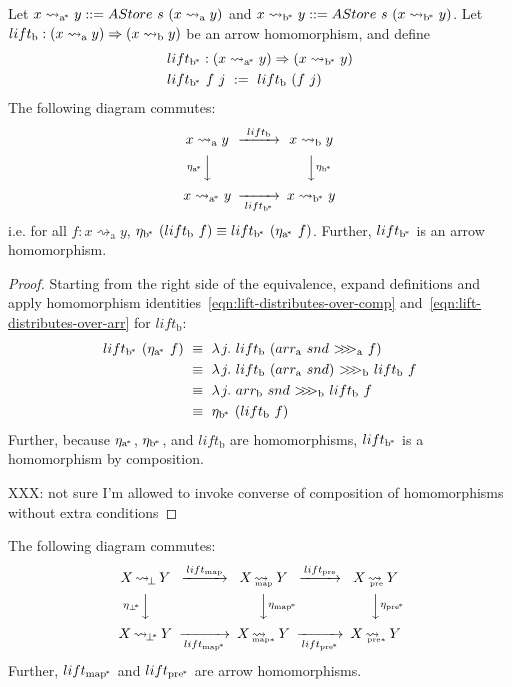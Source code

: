\documentclass[preprint]{sigplanconf}
\newcommand{\arrow}{\rightsquigarrow}
\newcommand{\arrowlift}{\ensuremath{lift}}
\newcommand{\arrowarr}{\ensuremath{arr}}
\newcommand{\arrowcomp}{\ensuremath{{>}\mspace{-6mu}{>}\mspace{-6mu}{>}}}
\newcommand{\arrowtrans}{\ensuremath{\eta}}
\newcommand{\gen}{_\mathrm{a}}
\newcommand{\genb}{_\mathrm{b}}
\newcommand{\genc}{_\mathrm{a^{\mspace{-2mu}*}}}
\newcommand{\gend}{_\mathrm{b^{\mspace{-2mu}*}}}
\DeclareMathOperator{\botto}{\arrow_{\mspace{-3mu}\bot}}
\newcommand{\map}{_\mathrm{map}}
\DeclareMathOperator{\mapto}{\arrow_{\mspace{-21mu}\map}}
\newcommand{\liftmap}{\arrowlift\map}
\newcommand{\pre}{_\mathrm{pre}}
\DeclareMathOperator{\preto}{\arrow_{\mspace{-19mu}\pre}}
\newcommand{\liftpre}{\arrowlift\pre}
\newcommand{\pbot}{{\bot^{\mspace{-4mu}*}}}
\DeclareMathOperator{\pbotto}{\arrow_{\mspace{-3mu}\pbot}}
\newcommand{\pmap}{_\mathrm{map^{\mspace{-2mu}*}}}
\DeclareMathOperator{\pmapto}{\arrow_{\mspace{-22mu}_{\mathrm{map*}}}}
\newcommand{\liftpmap}{\arrowlift\pmap}
\newcommand{\ppre}{_\mathrm{pre^{\mspace{-2mu}*}}}
\DeclareMathOperator{\ppreto}{\arrow_{\mspace{-19mu}_{\mathrm{pre*}}}}
\newcommand{\liftppre}{\arrowlift\ppre}
\begin{document}
\begin{theorem}
Let $x \arrow\genc y ::= AStore~s~(x \arrow\gen y)$ and $x \arrow\gend y ::= AStore~s~(x \arrow\gend y)$.
Let $\arrowlift\genb : (x \arrow\gen y) \tto (x \arrow\genb y)$ be an arrow homomorphism, and define
\begin{equation}
\begin{aligned}
	&\arrowlift\gend : (x \arrow\genc y) \tto (x \arrow\gend y) \\
	&\arrowlift\gend~f~j \ := \ \arrowlift\genb~(f~j)
\end{aligned}
\end{equation}
The following diagram commutes:
\begin{equation}
\begin{CD}
	x \arrow\gen y @>{\arrowlift\genb}>> x \arrow\genb y \\
	@V{\arrowtrans\genc}VV   @VV{\arrowtrans\gend}V \\
	x \arrow\genc y @>>{\arrowlift\gend}> x \arrow\gend y
\end{CD}
\end{equation}
i.e. for all $f : x \arrow\gen y$, $\arrowtrans\gend~(\arrowlift\genb~f) \equiv \arrowlift\gend~(\arrowtrans\genc~f)$.
Further, $\arrowlift\gend$ is an arrow homomorphism.
\end{theorem}
\begin{proof}
Starting from the right side of the equivalence, expand definitions and apply homomorphism identities~\eqref{eqn:lift-distributes-over-comp} and~\eqref{eqn:lift-distributes-over-arr} for $\arrowlift\genb$:
\begin{align*}
	\arrowlift\gend~(\arrowtrans\genc~f)
	&\ \equiv\ \fun{j}{\arrowlift\genb~(\arrowarr\gen~snd~\arrowcomp\gen~f)}
\\
	&\ \equiv\ \fun{j}{\arrowlift\genb~(\arrowarr\gen~snd)~\arrowcomp\genb~\arrowlift\genb~f}
\\
	&\ \equiv\ \fun{j}{\arrowarr\genb~snd~\arrowcomp\genb~\arrowlift\genb~f}
\\
	&\ \equiv\ \arrowtrans\gend~(\arrowlift\genb~f)
\end{align*}
Further, because $\arrowtrans\genc$, $\arrowtrans\gend$, and $\arrowlift\genb$ are homomorphisms, $\arrowlift\gend$ is a homomorphism by composition.

XXX: not sure I'm allowed to invoke converse of composition of homomorphisms without extra conditions
\end{proof}

\begin{corollary}
The following diagram commutes:
\begin{equation}
\begin{CD}
X \botto Y   @>\liftmap>>   X \mapto Y   @>\liftpre>>   X \preto Y \\
@V{\eta_\pbot}VV             @VV{\eta\pmap}V              @VV{\eta\ppre}V\\
X \pbotto Y  @>>\liftpmap>  X \pmapto Y  @>>\liftppre>  X \ppreto Y
\end{CD}
\end{equation}
Further, $\liftpmap$ and $\liftppre$ are arrow homomorphisms.
\end{corollary}
\end{document}
